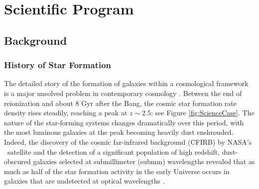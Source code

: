 \section{Scientific Program}

\subsection{Background}

\subsubsection{History of Star Formation}

The detailed story of the formation of galaxies within a cosmological
framework is a major unsolved problem in contemporary cosmology
\citep[see, e.g., the recent review by][]{benson10}.  Between the end
of reionization and about 8 Gyr after the Bang, the cosmic star
formation rate density rises steadily, reaching a peak at $z\sim2.5$;
see Figure \ref{fig:ScienceCase}.  The nature of the star-forming
systems changes dramatically over this period, with the most luminous
galaxies at the peak becoming heavily dust enshrouded.  Indeed, the
discovery of the cosmic far-infrared background (CFIRB) by NASA's
\cobe\ satellite \citep{puget96,fixsen98} and the detection of a
significant population of high redshift, dust-obscured galaxies
selected at submillimeter (submm) wavelengths \citep{smail97,hughes98}
revealed that as much as half of the star formation activity in the
early Universe occurs in galaxies that are undetected at optical
wavelengths \citep{chapman05,aretxaga07}.

